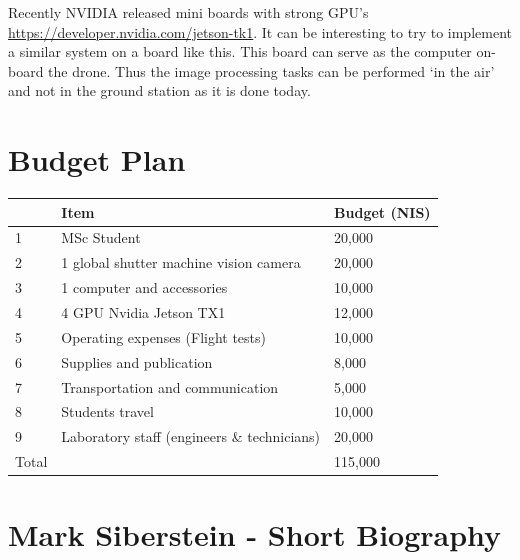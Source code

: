\documentclass{article} %
\begin{document}
Recently NVIDIA released mini boards with strong GPU's \url{https://developer.nvidia.com/jetson-tk1}. It can be interesting to try
to implement a similar system on a board like this. This board can serve as the computer
on-board the drone. Thus the image processing tasks can be performed `in the air' and not in the ground station as it is done today.

\section{Budget Plan}

\begin{center}
	\begin{tabular}{ | l | l | l | }
		\hline
				& Item 											& Budget (NIS) 	\\ \hline
		1		& MSc Student 									& 20,000    	\\ \hline
		2		& 1 global shutter machine vision camera 		& 20,000 		\\ \hline
		3 		& 1 computer and accessories 					& 10,000 		\\ \hline
		4 		& 4 GPU Nvidia Jetson TX1	 					& 12,000 		\\ \hline
		5 		& Operating expenses (Flight tests) 			& 10,000 		\\ \hline
		6 		& Supplies and publication	 					& 8,000 		\\ \hline
		7 		& Transportation and communication				& 5,000 		\\ \hline
		8 		& Students travel 								& 10,000 		\\ \hline
		9 		& Laboratory staff (engineers \& technicians)	& 20,000 		\\ \hline
		Total 	&  							 					& 115,000 		\\ \hline
	\end{tabular}
\end{center}

\section{Mark Siberstein - Short Biography}



\end{document}
